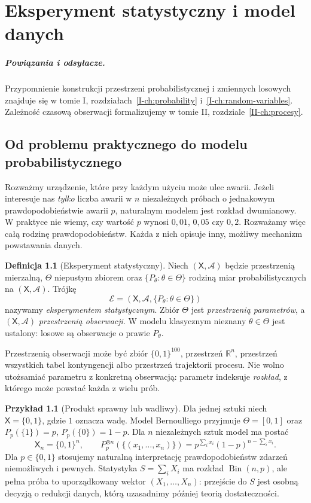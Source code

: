 \documentclass[11pt,a4paper,oneside]{report}
\numberwithin{equation}{chapter}
\theoremstyle{plain}
\theoremstyle{definition}
\newtheorem{definicja}{Definicja}[chapter]
\newtheorem{przyklad}{Przykład}[chapter]
\theoremstyle{remark}
\newcommand{\R}{\mathbb R}
\newcommand{\calA}{\mathcal A}
\DeclareMathOperator{\Bin}{Bin}
\begin{document}
\chapter{Eksperyment statystyczny i model danych}
\label{ch:eksperyment}
\paragraph{Powiązania i odsyłacze.} Przypomnienie konstrukcji przestrzeni probabilistycznej i zmiennych losowych znajduje się w tomie I, rozdziałach~\ref{I-ch:probability} i~\ref{I-ch:random-variables}. Zależność czasową obserwacji formalizujemy w tomie II, rozdziale~\ref{II-ch:procesy}.

\section{Od problemu praktycznego do modelu probabilistycznego}
Rozważmy urządzenie, które przy każdym użyciu może ulec awarii. Jeżeli interesuje nas \emph{tylko} liczba awarii w $n$ niezależnych próbach o jednakowym prawdopodobieństwie awarii $p$, naturalnym modelem jest rozkład dwumianowy. W praktyce nie wiemy, czy wartość $p$ wynosi $0{,}01$, $0{,}05$ czy $0{,}2$. Rozważamy więc całą rodzinę prawdopodobieństw. Każda z nich opisuje inny, możliwy mechanizm powstawania danych.

\begin{definicja}[Eksperyment statystyczny]\label{def:eksperyment}
Niech $(\mathsf X,\calA)$ będzie przestrzenią mierzalną, $\Theta$ niepustym zbiorem oraz $\{P_\theta:\theta\in\Theta\}$ rodziną miar probabilistycznych na $(\mathsf X,\calA)$. Trójkę
\[
\mathcal E=(\mathsf X,\calA,\{P_\theta:\theta\in\Theta\})
\]
nazywamy \emph{eksperymentem statystycznym}. Zbiór $\Theta$ jest \emph{przestrzenią parametrów}, a $(\mathsf X,\calA)$ \emph{przestrzenią obserwacji}. W modelu klasycznym nieznany $\theta\in\Theta$ jest ustalony: losowe są obserwacje o prawie $P_\theta$.
\end{definicja}

Przestrzenią obserwacji może być zbiór $\{0,1\}^{100}$, przestrzeń $\R^n$, przestrzeń wszystkich tabel kontyngencji albo przestrzeń trajektorii procesu. Nie wolno utożsamiać parametru z konkretną obserwacją: parametr indeksuje \emph{rozkład}, z którego może powstać każda z wielu prób.

\begin{przyklad}[Produkt sprawny lub wadliwy]\label{ex:bernoulli-exp}
Dla jednej sztuki niech $\mathsf X=\{0,1\}$, gdzie $1$ oznacza wadę. Model Bernoulliego przyjmuje $\Theta=[0,1]$ oraz $P_p(\{1\})=p$, $P_p(\{0\})=1-p$. Dla $n$ niezależnych sztuk model ma postać
\[
\mathsf X_n=\{0,1\}^n,\qquad
P_p^{\otimes n}(\{(x_1,\ldots,x_n)\})=p^{\sum_i x_i}(1-p)^{n-\sum_i x_i}.
\]
Dla $p\in\{0,1\}$ stosujemy naturalną interpretację prawdopodobieństw zdarzeń niemożliwych i pewnych. Statystyka $S=\sum_iX_i$ ma rozkład $\Bin(n,p)$, ale pełna próba to uporządkowany wektor $(X_1,\ldots,X_n)$: przejście do $S$ jest osobną decyzją o redukcji danych, którą uzasadnimy później teorią dostateczności.
\end{przyklad}
\end{document}
